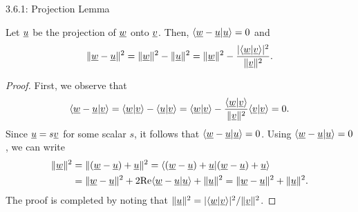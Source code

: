 \documentclass[10pt,letterpaper,english]{beamer}
\begin{document}
\begin{frame}{3.6.1: Projection Lemma}

\begin{lemma}
Let $\underline{u}$ be the projection of $\underline{w}$ onto $\underline{v}$.
Then, $\langle \underline{w}-\underline{u} | \underline{u} \rangle = 0$ and \vspace{-1mm}
\[ \|\underline{w}-\underline{u}\|^2 =  \|\underline{w}\|^2 - \| \underline{u} \|^2 = \|\underline{w}\|^2 - \frac{|\langle \underline{w} | \underline{v} \rangle|^2}{\|\underline{v}\|^2}. \]
\end{lemma}
\begin{proof}
First, we observe that \vspace{-1mm}
\[ \langle \vecnot{w} - \vecnot{u} | \vecnot{v} \rangle = \langle \vecnot{w} | \vecnot{v} \rangle - \langle \vecnot{u} | \vecnot{v} \rangle = \langle \vecnot{w} | \vecnot{v} \rangle - \frac{\left\langle \vecnot{w} | \vecnot{v} \right\rangle}{\|\vecnot{v}\|^2} \langle \vecnot{v} | \vecnot{v} \rangle = 0. \vspace{-1.5mm} \]
Since $\underline{u} = s \underline{v}$ for some scalar $s$, it follows that $\langle \underline{w}-\underline{u} | \underline{u} \rangle =  0$.
Using $\langle \underline{w}-\underline{u} | \underline{u} \rangle = 0$, we can write \vspace{-1mm}
\begin{align*}
\|\vecnot{w}\|^2 &= \|(\vecnot{w}-\vecnot{u})+\vecnot{u}\|^2
= \langle (\vecnot{w}-\vecnot{u})+\vecnot{u}|(\vecnot{w}-\vecnot{u})+\vecnot{u}\rangle \\
&= \|\vecnot{w}-\vecnot{u}\|^2 + 2 \Real \langle \vecnot{w}-\vecnot{u} | \vecnot{u} \rangle + \|\vecnot{u}\|^2
= \|\vecnot{w}-\vecnot{u}\|^2 + \|\vecnot{u}\|^2. \vspace{-1mm}
\end{align*}
The proof is completed by noting that $\|\underline{u}\|^2 = |\langle \underline{w} | \underline{v} \rangle|^2 / \|\underline{v}\|^2$.
\end{proof}

\end{frame}
\end{document}
